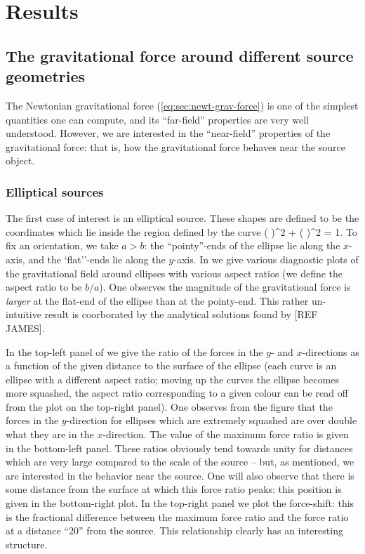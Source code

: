 \documentclass[amsmath,amssymb,12pt,eqsecnum]{revtex4}
\begin{document}
\section{Results}

\subsection{The gravitational force around different source geometries}
The Newtonian gravitational force (\ref{eq:sec:newt-grav-force}) is one of the simplest quantities one can compute, and its ``far-field'' properties are very well understood. However, we are interested in the ``near-field'' properties of the gravitational force: that is, how the gravitational force behaves near the source object.

\subsubsection{Elliptical sources}
The first case of interest is an elliptical source. These shapes are defined to be the coordinates which lie inside the region defined by the curve
\bea
\left( \right)^2 + \left( \right)^2 = 1.
\eea
To fix an orientation, we take $a > b$: the ``pointy''-ends of the ellipse lie along the $x$-axis, and the `flat''-ends lie along the $y$-axis. In  we give various diagnostic plots of the gravitational field around ellipses with various aspect ratios (we define the aspect ratio to be $b/a$). One observes the magnitude of the gravitational force is \textit{larger} at the flat-end of the ellipse than at the pointy-end. This rather un-intuitive result is coorborated by the analytical solutions found by [REF JAMES]. 

In the top-left panel of  we give the ratio of the forces in the $y$- and $x$-directions as a function of the given distance to the surface of the ellipse (each curve is an ellipse with a different aspect ratio; moving up the curves the ellipse becomes more squashed,  the aspect ratio corresponding to a given colour can be read off from the plot on the top-right panel). One observes from the figure that the forces in the $y$-direction for ellipses which are extremely squashed are over double what they are in the $x$-direction. The value of the maximum force ratio is given in the bottom-left panel. These ratios obviously tend towards unity for distances which are very large compared to the scale of the source -- but, as mentioned, we are interested in the behavior near the source. One will also observe that there is some distance from the surface at which this force ratio peaks: this position is given in the bottom-right plot. In the top-right panel we plot the force-shift: this is the fractional difference between the maximum force ratio and the force ratio at a distance ``20'' from the source. This relationship clearly has an interesting structure.
\end{document}
